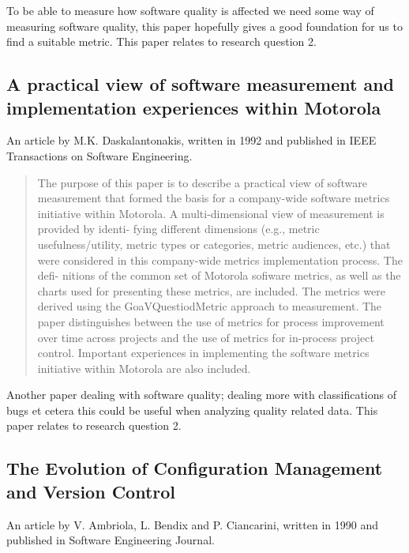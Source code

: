 \documentclass{llncs}
\begin{document}
To be able to measure how software quality is affected we need some
way of measuring software quality, this paper hopefully gives a good
foundation for us to find a suitable metric. This paper relates to
research question 2.

\subsection{A practical view of software measurement and
  implementation experiences within Motorola}

An article by M.K. Daskalantonakis, written in 1992 and published in
IEEE Transactions on Software Engineering.

\begin{abstract}
 The purpose of this paper is to describe a practical view of
 software measurement that formed the basis for a company-wide
 software metrics initiative within Motorola. A multi-dimensional
 view of measurement is provided by identi- fying different
 dimensions (e.g., metric usefulness/utility, metric types or
 categories, metric audiences, etc.) that were considered in this
 company-wide metrics implementation process. The defi- nitions of
 the common set of Motorola sofiware metrics, as well as the charts
 used for presenting these metrics, are included. The metrics were
 derived using the GoaVQuestiodMetric approach to measurement. The
 paper distinguishes between the use of metrics for process
 improvement over time across projects and the use of metrics for
 in-process project control. Important experiences in implementing
 the software metrics initiative within Motorola are also included.
\end{abstract}

Another paper dealing with software quality; dealing more with
classifications of bugs et cetera this could be useful when analyzing
quality related data. This paper relates to research question 2.

\subsection{The Evolution of Configuration Management and Version
  Control}

An article by V. Ambriola, L. Bendix and P. Ciancarini, written in
1990 and published in Software Engineering Journal.
\end{document}
